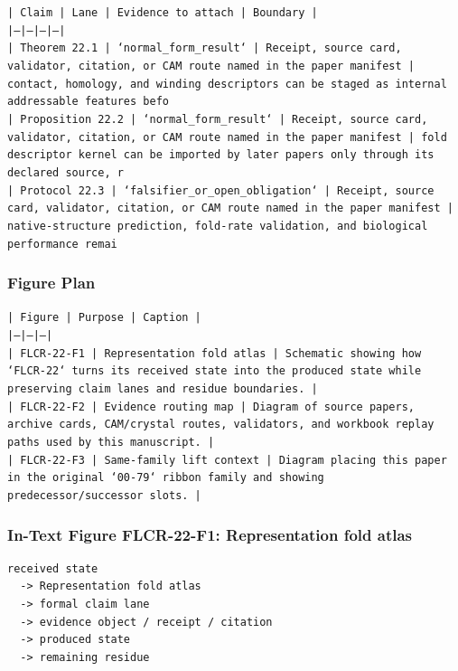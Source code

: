 \documentclass[11pt]{article}
\begin{document}
\noindent\texttt{| Claim | Lane | Evidence to attach | Boundary |}\\
\noindent\texttt{|---|---|---|---|}\\
\noindent\texttt{| Theorem 22.1 | `normal\_form\_result` | Receipt, source card, validator, citation, or CAM route named in the paper manifest | contact, homology, and winding descriptors can be staged as internal addressable features befo}\\
\noindent\texttt{| Proposition 22.2 | `normal\_form\_result` | Receipt, source card, validator, citation, or CAM route named in the paper manifest | fold descriptor kernel can be imported by later papers only through its declared source, r}\\
\noindent\texttt{| Protocol 22.3 | `falsifier\_or\_open\_obligation` | Receipt, source card, validator, citation, or CAM route named in the paper manifest | native-structure prediction, fold-rate validation, and biological performance remai}\\

\subsubsection*{Figure Plan}

\noindent\texttt{| Figure | Purpose | Caption |}\\
\noindent\texttt{|---|---|---|}\\
\noindent\texttt{| FLCR-22-F1 | Representation fold atlas | Schematic showing how `FLCR-22` turns its received state into the produced state while preserving claim lanes and residue boundaries. |}\\
\noindent\texttt{| FLCR-22-F2 | Evidence routing map | Diagram of source papers, archive cards, CAM/crystal routes, validators, and workbook replay paths used by this manuscript. |}\\
\noindent\texttt{| FLCR-22-F3 | Same-family lift context | Diagram placing this paper in the original `00-79` ribbon family and showing predecessor/successor slots. |}\\

\subsubsection*{In-Text Figure FLCR-22-F1: Representation fold atlas}

\begin{verbatim}
received state
  -> Representation fold atlas
  -> formal claim lane
  -> evidence object / receipt / citation
  -> produced state
  -> remaining residue
\end{verbatim}
\end{document}
